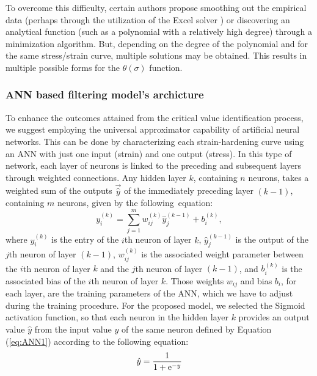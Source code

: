 \documentclass[metals,article,submit,pdftex,moreauthors]{Definitions/mdpi}
\DeclareRobustCommand{\e}[1]{{\rm e}^{#1}}
\DeclareRobustCommand{\lay}[1]{^{(#1)}}
\begin{document}
To overcome this difficulty, certain authors propose smoothing out the empirical data (perhaps through the utilization of the Excel solver \cite{Najafizadeh-2006}) or discovering an analytical function (such as a polynomial with a relatively high degree) through a minimization algorithm.
But, depending on the degree of the polynomial and for the same stress/strain curve, multiple solutions may be obtained.
This results in multiple possible forms for the $\theta(\sigma)$ function.

\subsubsection{ANN based filtering model's archicture \label{subsec:ANNbasics}}

To enhance the outcomes attained from the critical value identification process, we suggest employing the universal approximator capability of artificial neural networks.
This can be done by characterizing each strain-hardening curve using an ANN with just one input (strain) and one output (stress).
In this type of network, each layer of neurons is linked to the preceding and subsequent layers through weighted connections.
Any hidden layer $k$, containing $n$ neurons, takes a weighted sum of the outputs $\overrightarrow{\hat{y}}$ of the immediately preceding layer $(k-1)$, containing $m$ neurons, given by the following~equation:
\begin{equation}
y_i\lay{k} = \sum_{j=1}^m w_{ij}\lay{k} \hat{y}_j^{(k-1)}+ b_i\lay{k},\label{eq:ANN1}
\end{equation}
where $y_i\lay{k}$ is the entry of the $i$th neuron of layer $k$, $\hat{y}_j\lay{k-1}$ is the output of the $j$th neuron of layer $(k-1)$, $w_{ij}\lay{k}$ is the associated weight parameter between the $i$th neuron of layer $k$ and the $j$th neuron of layer $(k-1)$, and $b_i\lay{k}$ is the associated bias of the $i$th neuron of layer $k$.
Those weights $w_{ij}$ and bias $b_i$, for each layer, are the training parameters of the ANN, which we have to adjust during the training procedure.
For the proposed model, we selected the Sigmoid activation function, so that each neuron in the hidden layer $k$ provides an output value ${\hat{y}}$ from the input value $y$ of the same neuron defined by Equation (\ref{eq:ANN1}) according to the following equation:
\begin{equation}
\hat{y}=\frac{1}{1 + \e{-y}}\label{eq:ANN2}
\end{equation}
\end{document}
